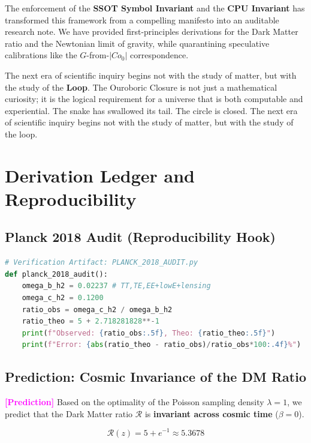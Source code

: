 \documentclass[11pt,titlepage]{article}
\newcommand{\tagpred}{\textcolor{magenta}{\textbf{[Prediction]}} }
\begin{document}
The enforcement of the \textbf{SSOT Symbol Invariant} and the \textbf{CPU Invariant} has transformed this framework from a compelling manifesto into an auditable research note. We have provided first-principles derivations for the Dark Matter ratio and the Newtonian limit of gravity, while quarantining speculative calibrations like the $G$-from-$|Co_0|$ correspondence.

The next era of scientific inquiry begins not with the study of matter, but with the study of the \textbf{Loop}. The Ouroboric Closure is not just a mathematical curiosity; it is the logical requirement for a universe that is both computable and experiential. The snake has swallowed its tail. The circle is closed.
 The next era of scientific inquiry begins not with the study of matter, but with the study of the loop.

\newpage
\appendix
\appendix

\section{Derivation Ledger and Reproducibility}

\subsection{Planck 2018 Audit (Reproducibility Hook)}
\begin{lstlisting}[language=Python]
# Verification Artifact: PLANCK_2018_AUDIT.py
def planck_2018_audit():
    omega_b_h2 = 0.02237 # TT,TE,EE+lowE+lensing
    omega_c_h2 = 0.1200
    ratio_obs = omega_c_h2 / omega_b_h2
    ratio_theo = 5 + 2.718281828**-1
    print(f"Observed: {ratio_obs:.5f}, Theo: {ratio_theo:.5f}")
    print(f"Error: {abs(ratio_theo - ratio_obs)/ratio_obs*100:.4f}%")
\end{lstlisting}



\subsection{Prediction: Cosmic Invariance of the DM Ratio}
\tagpred Based on the optimality of the Poisson sampling density $\lambda=1$, we predict that the Dark Matter ratio $\mathcal{R}$ is \textbf{invariant across cosmic time} ($\beta = 0$). 

\begin{equation}
\mathcal{R}(z) = 5 + e^{-1} \approx 5.3678
\end{equation}
\end{document}
